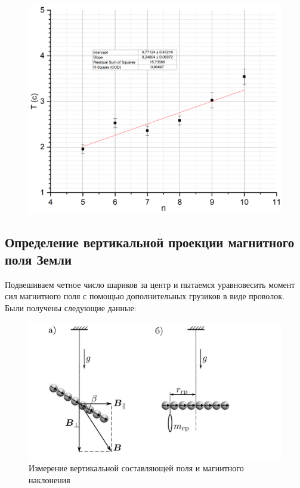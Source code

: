 \documentclass[a4paper, 12pt]{article}
\begin{document}
	\begin{figure}[h!]
		\centering
		\includegraphics[width = \textwidth]{T(n)}
		\caption{}
	\end{figure}
	
	\subsection*{Определение вертикальной проекции магнитного поля Земли}
	Подвешиваем четное число шариков за центр и пытаемся уравновесить момент сил магнитного поля с помощью дополнительных грузиков в виде проволок. Были получены следующие данные:
	
	\begin{figure}[H]
		\centering
		\includegraphics[scale=0.21]{vert}
		\caption{Измерение вертикальной составляющей поля и магнитного наклонения}
		\label{vert}
	\end{figure}
	
\end{document}
